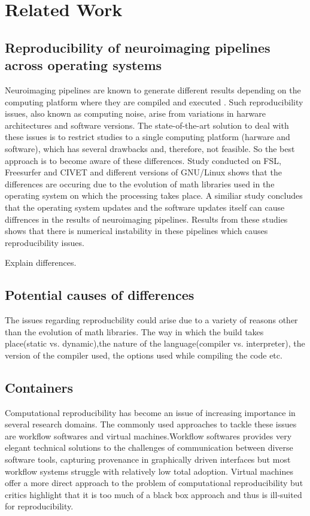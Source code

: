 \chapter{Related Work}

\section{Reproducibility of neuroimaging pipelines across operating systems}
Neuroimaging pipelines are known to generate different results depending on the computing platform where they are compiled and executed \cite{Gla15}. Such reproducibility issues, also known as computing noise, arise from variations in harware architectures and software versions. The state-of-the-art solution to deal with these issues is to restrict studies to a single computing platform (harware and software), which has several drawbacks and, therefore, not feasible. So the best approach is to become aware of these differences.
Study conducted on FSL, Freesurfer and CIVET and different versions of GNU/Linux \cite{Gla15} shows that the differences are occuring due to the evolution of math libraries used in the operating system on which the processing takes place. A similiar study \cite{10.1371/journal.pone.0038234} concludes that the operating system updates and the software updates itself can cause diffrences in the results of neuroimaging pipelines. Results from these studies shows that there is numerical instability in these pipelines which causes reproducibility issues.

Explain differences.

\section{Potential causes of differences}
The issues regarding reproducbility could arise due to a variety of reasons other than the evolution of math libraries. The way in which the build takes place(static vs. dynamic),the nature of the language(compiler vs. interpreter), the version of the compiler used, the options used while compiling the code etc. 

\section{Containers}
Computational reproducibility has become an issue of increasing importance in several research domains.	The commonly used approaches to tackle these issues are workflow softwares and virtual machines.Workflow softwares provides very elegant technical solutions to the challenges of communication between diverse software tools, capturing provenance in graphically driven interfaces but most workflow systems struggle with relatively low total adoption. Virtual machines offer a more direct approach to the problem of computational reproducibility but critics highlight that it is too much of a black box approach and thus is ill-suited for reproducibility.\cite{Boettiger:2015:IDR:2723872.2723882}

